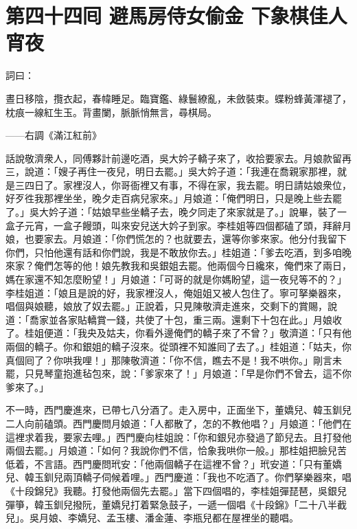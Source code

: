 
\chapter*{第四十四囘 避馬房侍女偷金 下象棋佳人宵夜}


詞曰：

晝日移陰，攬衣起，春幃睡足。臨寶鑑、綠鬟繚亂，未斂裝束。蝶粉蜂黃渾褪了，枕痕一線紅生玉。背畫闌，脈脈悄無言，尋棋局。

——右調《滿江紅前》

話說敬濟衆人，同傅夥計前邊吃酒，吳大妗子轎子來了，收拾要家去。月娘款留再三，說道：「嫂子再住一夜兒，明日去罷。」吳大妗子道：「我連在喬親家那裡，就是三四日了。家裡沒人，你哥衙裡又有事，不得在家，我去罷。明日請姑娘衆位，好歹徃我那裡坐坐，晚夕走百病兒家來。」月娘道：「俺們明日，只是晚上些去罷了。」吳大妗子道：「姑娘早些坐轎子去，晚夕同走了來家就是了。」說畢，裝了一盒子元宵，一盒子饅頭，叫來安兒送大妗子到家。李桂姐等四個都磕了頭，拜辭月娘，也要家去。月娘道：「你們慌怎的？也就要去，還等你爹來家。他分付我留下你們，只怕他還有話和你們說，我是不敢放你去。」桂姐道：「爹去吃酒，到多咱晚來家？俺們怎等的他！娘先教我和吳銀姐去罷。他兩個今日纔來，俺們來了兩日，媽在家還不知怎麼盼望！」月娘道：「可哥的就是你媽盼望，這一夜兒等不的？」李桂姐道：「娘且是說的好，我家裡沒人，俺姐姐又被人包住了。寧可拏樂器來，唱個與娘聽，娘放了奴去罷。」正說着，只見陳敬濟走進來，交剩下的賞賜，說道：「喬家並各家貼轎賞一錢，共使了十包，重三兩。還剩下十包在此。」月娘收了。桂姐便道：「我央及姑夫，你看外邊俺們的轎子來了不曾？」敬濟道：「只有他兩個的轎子。你和銀姐的轎子沒來。從頭裡不知誰囘了去了。」桂姐道：「姑夫，你真個囘了？你哄我哩！」那陳敬濟道：「你不信，瞧去不是！我不哄你。」剛言未罷，只見琴童抱進毡包來，說：「爹家來了！」月娘道：「早是你們不曾去，這不你爹來了。」

不一時，西門慶進來，已帶七八分酒了。走入房中，正面坐下，董嬌兒、韓玉釧兒二人向前磕頭。西門慶問月娘道：「人都散了，怎的不教他唱？」月娘道：「他們在這裡求着我，要家去哩。」西門慶向桂姐說：「你和銀兒亦發過了節兒去。且打發他兩個去罷。」月娘道：「如何？我說你們不信，恰象我哄你一般。」那桂姐把臉兒苦低着，不言語。{}西門慶問玳安：「他兩個轎子在這裡不曾？」玳安道：「只有董嬌兒、韓玉釧兒兩頂轎子伺候着哩。」西門慶道：「我也不吃酒了。你們拏樂器來，唱《十段錦兒》我聽。打發他兩個先去罷。」當下四個唱的，李桂姐彈琵琶，吳銀兒彈箏，韓玉釧兒撥阮，董嬌兒打着緊急鼓子，一遞一個唱《十段錦》「二十八半截兒」。吳月娘、李嬌兒、孟玉樓、潘金蓮、李瓶兒都在屋裡坐的聽唱。

